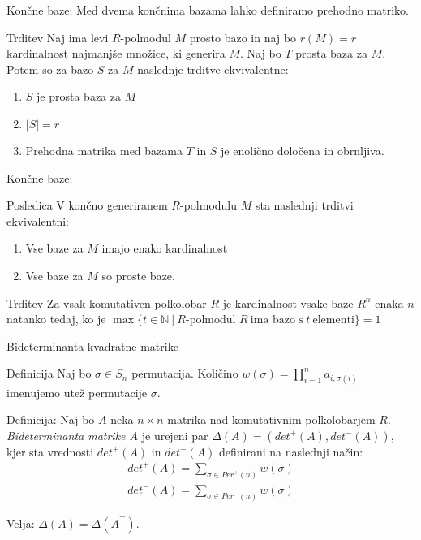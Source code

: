 \documentclass[t, 11pt]{beamer} %
\newcommand{\abs}[1]{\ensuremath{\lvert #1 \rvert}}
\newcommand{\mth}[1]{\ensuremath{\mathbb{#1}}}
\newcommand{\N}{\mth{N}}
\newcommand{\pojem}[1]{\emph{#1}}
\newcommand{\fillblack}[1]{
\begin{tikzpicture}[remember picture, overlay]
    \node [shift={(0 cm,0cm)}]  at (current page.south west)
        {%
        \begin{tikzpicture}[remember picture, overlay] at (current page.south west)
            \draw [fill=black] (0, 0) -- (0,#1 \paperheight) --
                              (\paperwidth,#1 \paperheight) -- (\paperwidth,0) -- cycle ;
        \end{tikzpicture}
        };
        \draw (current page.north west) rectangle (current page.south east);
\end{tikzpicture}
}
\begin{document}
\begin{frame}{Končne baze:}
	Med dvema končnima bazama lahko definiramo prehodno matriko.
	\begin{block}{Trditev}
		Naj ima levi $R$-polmodul $M$ prosto bazo in naj bo $r(M) = r$ kardinalnost najmanjše množice, ki generira $M$. Naj bo $T$ prosta baza za $M$. Potem so za bazo $S$ za $M$ naslednje trditve ekvivalentne:
		\begin{enumerate}
			\item $S$ je prosta baza za $M$
			\item $\abs{S} = r$
			\item Prehodna matrika med bazama $T$ in $S$ je enolično določena in obrnljiva.
		\end{enumerate}
	\end{block}
\end{frame}
\begin{frame}{Končne baze:}
\begin{block}{Posledica}
	V končno generiranem $R$-polmodulu $M$ sta naslednji trditvi ekvivalentni: \begin{enumerate}
		\item Vse baze za $M$ imajo enako kardinalnost
		\item Vse baze za $M$ so proste baze.
	\end{enumerate}
\end{block}

\begin{block}{Trditev}
	Za vsak komutativen polkolobar $R$ je kardinalnost vsake baze $R^n$ enaka $n$ natanko tedaj, ko je $\max\{t\in \N~|~R\text{-polmodul~} R ~\text{ima bazo s}~ t ~\text{elementi}\} = 1$
\end{block}
\end{frame}

\begin{frame}{Bideterminanta kvadratne matrike}
	\begin{block}{Definicija}
		Naj bo $\sigma\in S_n$ permutacija. Količino $w(\sigma) = \prod_{i = 1}^{n} a_{i, \sigma(i)}$ imenujemo utež permutacije $\sigma$.
	\end{block}
	\begin{block}{Definicija:}
			Naj bo $A$ neka $n\times n$ matrika nad komutativnim polkolobarjem $R$. \pojem{Bideterminanta matrike $A$} je urejeni par $\Delta(A) =(det^{+}(A), det^{-}(A))$, kjer sta vrednosti $det^{+}(A)$ in $det^{-}(A)$ definirani na naslednji način:
			\begin{align*}
				det^{+}(A) = \sum_{\sigma\in Per^{+}(n)} w(\sigma) \\
				det^{-}(A) = \sum_{\sigma\in Per^{-}(n)} w(\sigma)
			\end{align*}
	\end{block}

Velja: $\Delta(A) = \Delta(A^\top)$.
\end{frame}
\end{document}
